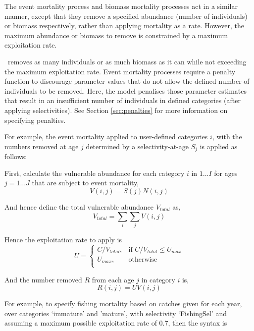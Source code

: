 The event mortality process and biomass mortality processes act in a similar manner, except that they remove a specified abundance (number of individuals) or biomass respectively, rather than applying mortality as a rate. However, the maximum abundance or biomass to remove is constrained by a maximum exploitation rate.

 \CNAME\ removes as many individuals or as much biomass as it can while not exceeding the maximum exploitation rate. Event mortality processes require a penalty function to discourage parameter values that do not allow the defined number of individuals to be removed. Here, the model penalises those parameter estimates that result in an insufficient number of individuals in defined categories (after applying selectivities). See Section \ref{sec:penalties} for more information on specifying penalties.

For example, the event mortality applied to user-defined categories $i$, with the numbers removed at age $j$ determined by a selectivity-at-age $S_j$ is applied as follows:

First, calculate the vulnerable abundance for each category $i$ in $1 \ldots I$ for ages $j = 1 \ldots J$ that are subject to event mortality,
\begin{equation}
  V(i,j) = S(j) N(i,j)
\end{equation}

And hence define the total vulnerable abundance $V_{total}$ as,
\begin{equation}
  V_{total}  = \sum\limits_i {\sum\limits_j {V(i,j)}} 
\end{equation}

Hence the exploitation rate to apply is 
\begin{equation}
U = \begin{cases}
  C/V_{total}, & \text{if $C/V_{total} \leq U_{max}$} \\
  U_{max}, & \text{otherwise}\\ 
  \end{cases} 
\end{equation}

And the number removed $R$ from each age $j$ in category $i$ is,
\begin{equation}
  R(i,j) = UV(i,j)
\end{equation}

For example, to specify fishing mortality based on catches given for each year, over categories `immature' and 'mature', with selectivity `FishingSel' and assuming a maximum possible exploitation rate of 0.7, then the syntax is

